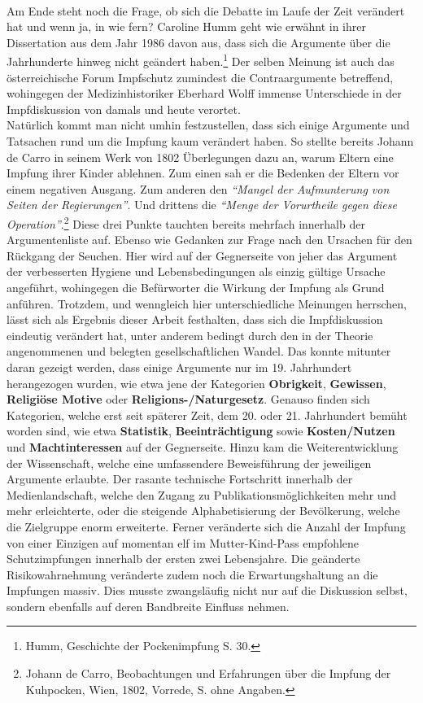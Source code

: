 \documentclass[
    a4paper,
    12pt,
    hyphens,
    chapterprefix=true,
    headheight=33pt,
    footheight=29pt,
    headings=optiontohead,
]{scrartcl}
\begin{document}
{\\
Am Ende steht noch die Frage, ob sich die Debatte im Laufe der Zeit verändert hat und wenn ja, in wie fern? Caroline Humm geht wie erwähnt in ihrer Dissertation aus dem Jahr 1986 davon aus, dass sich die Argumente über die Jahrhunderte hinweg nicht geändert haben.\footnote{Humm, Geschichte der Pockenimpfung S. 30.} Der selben Meinung ist auch das österreichische Forum Impfschutz zumindest die Contraargumente betreffend, wohingegen der Medizinhistoriker Eberhard Wolff immense Unterschiede in der Impfdiskussion von damals und heute verortet.\\
Natürlich kommt man nicht umhin festzustellen, dass sich einige Argumente und Tatsachen rund um die Impfung kaum verändert haben. So stellte bereits Johann de Carro in seinem Werk von 1802 Überlegungen dazu an, warum Eltern eine Impfung ihrer Kinder ablehnen. Zum einen sah er die Bedenken der Eltern vor einem negativen Ausgang. Zum anderen den \textit{"`Mangel der Aufmunterung von Seiten der Regierungen"'}. Und drittens die \textit{"`Menge der Vorurtheile gegen diese Operation"'}.\footnote{Johann de Carro, Beobachtungen und Erfahrungen über die Impfung der Kuhpocken, Wien, 1802, Vorrede, S. ohne Angaben.} Diese drei Punkte tauchten bereits mehrfach innerhalb der Argumentenliste auf. Ebenso wie Gedanken zur Frage nach den Ursachen für den Rückgang der Seuchen. Hier wird auf der Gegnerseite von jeher das Argument der verbesserten Hygiene und Lebensbedingungen als einzig gültige Ursache angeführt, wohingegen die Befürworter die Wirkung der Impfung als Grund anführen. Trotzdem, und wenngleich hier unterschiedliche Meinungen herrschen, lässt sich als Ergebnis dieser Arbeit festhalten, dass sich die Impfdiskussion eindeutig verändert hat, unter anderem bedingt durch den in der Theorie angenommenen und belegten gesellschaftlichen Wandel. Das konnte mitunter daran gezeigt werden, dass einige Argumente nur im 19. Jahrhundert herangezogen wurden, wie etwa jene der Kategorien \textbf{Obrigkeit}, \textbf{Gewissen}, \textbf{Religiöse Motive} oder \textbf{Religions-/Naturgesetz}.
Genauso finden sich Kategorien, welche erst seit späterer Zeit, dem 20. oder 21. Jahrhundert bemüht worden sind, wie etwa \textbf{Statistik}, \textbf{Beeinträchtigung} sowie \textbf{Kosten/Nutzen} und \textbf{Machtinteressen} auf der Gegnerseite. Hinzu kam die Weiterentwicklung der Wissenschaft, welche eine umfassendere Beweisführung der jeweiligen Argumente erlaubte. Der rasante technische Fortschritt innerhalb der Medienlandschaft, welche den Zugang zu Publikationsmöglichkeiten mehr und mehr erleichterte, oder die steigende Alphabetisierung der Bevölkerung, welche die Zielgruppe enorm erweiterte. Ferner veränderte sich die Anzahl der Impfung von einer Einzigen auf momentan elf im Mutter-Kind-Pass empfohlene Schutzimpfungen innerhalb der ersten zwei Lebensjahre. Die geänderte Risikowahrnehmung veränderte zudem noch die Erwartungshaltung an die Impfungen massiv. Dies musste zwangsläufig nicht nur auf die Diskussion selbst, sondern ebenfalls auf deren Bandbreite Einfluss nehmen.









}
\end{document}
